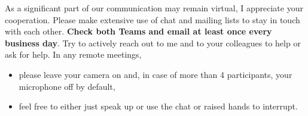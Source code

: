         As a significant part of our communication may remain virtual, I appreciate your cooperation. Please make extensive use of chat and mailing lists to stay in touch with each other. \textbf{Check both Teams and email at least once every business day}.
        Try to actively reach out to me and to your colleagues to help or ask for help. In any remote meetings,
        \begin{itemize}
            \item   please leave your camera on and, in case of more than 4 participants, your microphone off by default,
            \item   feel free to either just speak up or use the chat or raised hands to interrupt.
        \end{itemize}
